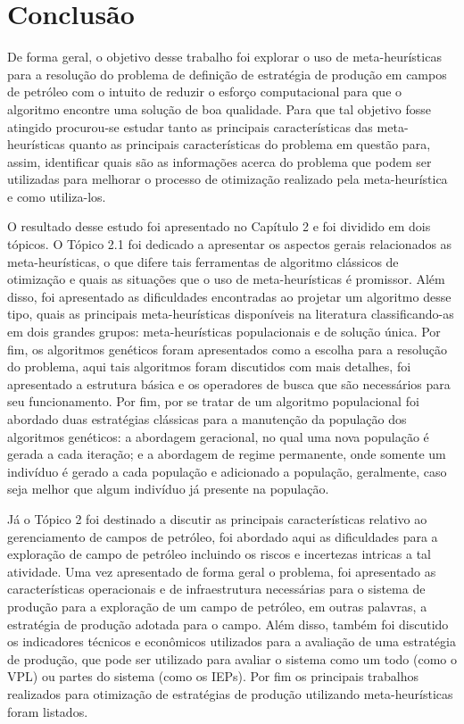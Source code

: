 
\chapter{Conclusão}
\label{ch:ch6}
De forma geral, o objetivo desse trabalho foi explorar o uso de meta-heurísticas para a resolução do problema de definição de estratégia de produção em campos de petróleo com o intuito de reduzir o esforço computacional para que o algoritmo encontre uma solução de boa qualidade. Para que tal objetivo fosse atingido procurou-se estudar tanto as principais características das meta-heurísticas quanto as principais características do problema em questão para, assim, identificar quais são as informações acerca do problema que podem ser utilizadas para melhorar o processo de otimização realizado pela meta-heurística e como utiliza-los.  

O resultado desse estudo foi apresentado no Capítulo 2 e foi dividido em dois tópicos. O Tópico 2.1 foi dedicado a apresentar os aspectos gerais relacionados as meta-heurísticas, o que difere tais ferramentas de algoritmo clássicos de otimização e quais as situações que o uso de meta-heurísticas é promissor. Além disso, foi apresentado as dificuldades encontradas ao projetar um algoritmo desse tipo, quais as principais meta-heurísticas disponíveis na literatura classificando-as em dois grandes grupos: meta-heurísticas populacionais e de solução única. Por fim, os algoritmos genéticos foram apresentados como a escolha para a resolução do problema, aqui tais algoritmos foram discutidos com mais detalhes, foi apresentado a estrutura básica e os operadores de busca que são necessários para seu funcionamento. Por fim, por se tratar de um algoritmo populacional foi abordado duas estratégias clássicas para a manutenção da população dos algoritmos genéticos: a abordagem geracional, no qual uma nova população é gerada a cada iteração; e a abordagem de regime permanente, onde somente um indivíduo é gerado a cada população e adicionado a população, geralmente, caso seja melhor que algum indivíduo já presente na população. 

Já o Tópico 2 foi destinado a discutir as principais características relativo ao gerenciamento de campos de petróleo, foi abordado aqui as dificuldades para a exploração de campo de petróleo incluindo os riscos e incertezas intricas a tal atividade. Uma vez apresentado de forma geral o problema, foi apresentado as características operacionais e de infraestrutura necessárias para o sistema de produção para a exploração de um campo de petróleo, em outras palavras, a estratégia de produção adotada para o campo. Além disso, também foi discutido os indicadores técnicos e econômicos utilizados para a avaliação de uma estratégia de produção, que pode ser utilizado para avaliar o sistema como um todo (como o VPL) ou partes do sistema (como os IEPs). Por fim os principais trabalhos realizados para otimização de estratégias de produção utilizando meta-heurísticas foram listados.

